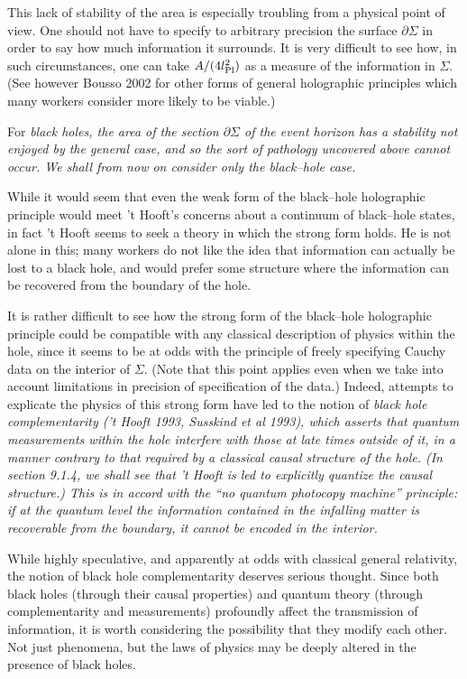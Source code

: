 This lack of stability of the area is especially troubling
from a physical point of view.  One should not have to specify to
arbitrary precision the surface $\partial\Sigma$ in order to say how much
information it surrounds.
It is
very difficult to see how, in such circumstances, one can take
$A/(4l_{\rm Pl}^2)$ as a measure of the information in
$\Sigma$.  (See however Bousso 2002 for other forms of general
holographic principles which many workers consider more 
likely to be viable.)

For \it black holes\rm , the area of the section $\partial\Sigma$ of
the event horizon has a stability not enjoyed by the \it general \rm
case, and so the sort of pathology uncovered above
cannot occur.  We shall from now on consider only the black--hole case.

While it would seem that even the weak form of the black--hole
holographic principle would meet 't Hooft's concerns about a continuum
of black--hole states, in fact 't Hooft seems to seek a theory in
which the strong form holds.  He is not alone in this; many workers do
not like the idea that information can actually be lost to a black
hole, and would prefer some structure where the information can be
recovered from the boundary of the hole.  

It is rather difficult to see how the strong form of the black--hole
holographic principle could
be compatible with any classical description of physics within the
hole, since it
seems to be at odds with the principle of freely specifying Cauchy
data on the interior of $\Sigma$.  
(Note that this point applies even when we take into
account limitations in precision of specification of the data.)  
Indeed, attempts to explicate the physics of this strong form have led to
the notion of \it
black hole complementarity \rm  ('t Hooft 1993, Susskind et al 1993), which 
asserts that quantum measurements within the hole \it interfere \rm with those
at late times outside of it, in a manner contrary to that required by a
classical causal structure of the hole.  
(In section 9.1.4, we shall see that 't Hooft is led to explicitly
quantize the causal structure.)
This is in accord with the
``no quantum photocopy machine'' principle:  if at the quantum level the
information contained in the infalling matter \it is \rm
recoverable from the boundary, it \it cannot \rm be encoded in the interior.

While highly speculative, and apparently at odds with classical
general relativity, the notion of black hole complementarity deserves
serious thought.  Since both black holes (through their causal
properties) and quantum theory (through complementarity
and measurements) profoundly
affect the transmission of information, it is worth considering
the possibility that they modify each other.  
Not just phenomena, but the laws of physics may be deeply altered in
the presence of black holes.


